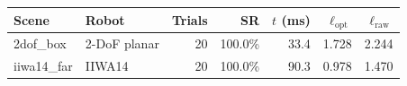 \begin{tabular}{llrrrrr}
  \toprule
  Scene & Robot & Trials & SR & $t$ (ms) & $\ell_{\mathrm{opt}}$ & $\ell_{\mathrm{raw}}$ \\
  \midrule
  2dof\_box & 2-DoF planar & 20 & 100.0\% & 33.4 & 1.728 & 2.244 \\
  iiwa14\_far & IIWA14 & 20 & 100.0\% & 90.3 & 0.978 & 1.470 \\
  \bottomrule
\end{tabular}
